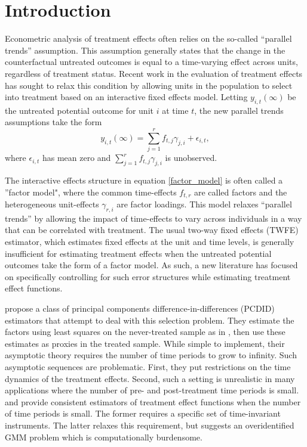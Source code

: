 \documentclass[12pt,fleqn]{article}
\begin{document}
\section{Introduction}

Econometric analysis of treatment effects often relies on the so-called ``parallel trends'' assumption. This assumption generally states that the change in the counterfactual untreated outcomes is equal to a time-varying effect across units, regardless of treatment status. Recent work in the evaluation of treatment effects has sought to relax this condition by allowing units in the population to select into treatment based on an interactive fixed effects model. Letting $y_{i,t}(\infty)$ be the untreated potential outcome for unit $i$ at time $t$, the new parallel trends assumptions take the form
\begin{equation}
    y_{i,t}(\infty) = \sum_{j = 1}^r f_{t,j} \gamma_{j,i} + \epsilon_{i,t},\label{factor_model}
\end{equation}
where $\epsilon_{i,t}$ has mean zero and $\sum_{j = 1}^r f_{t,j} \gamma_{j,i}$ is unobserved.

The interactive effects structure in equation \eqref{factor_model} is often called a ''factor model", where the common time-effects $f_{t,r}$ are called factors and the heterogeneous unit-effects $\gamma_{r,i}$ are factor loadings. This model relaxes ``parallel trends'' by allowing the impact of time-effects to vary across individuals in a way that can be correlated with treatment. The usual two-way fixed effects (TWFE) estimator, which estimates fixed effects at the unit and time levels, is generally insufficient for estimating treatment effects when the untreated potential outcomes take the form of a factor model. As such, a new literature has focused on specifically controlling for such error structures while estimating treatment effect functions.

\citet{chan2022pcdid} propose a class of principal components difference-in-differences (PCDID) estimators that attempt to deal with this selection problem. They estimate the factors using least squares on the never-treated sample as in \citet{bai2009panel}, then use these estimates as proxies in the treated sample. While simple to implement, their asymptotic theory requires the number of time periods to grow to infinity. Such asymptotic sequences are problematic. First, they put restrictions on the time dynamics of the treatment effects. Second, such a setting is unrealistic in many applications where the number of pre- and post-treatment time periods is small. \citet{Callaway_Karami_2020} and \citet{brown2022generalized} provide consistent estimators of treatment effect functions when the number of time periods is small. The former requires a specific set of time-invariant instruments. The latter relaxes this requirement, but suggests an overidentified GMM problem which is computationally burdensome.
\end{document}
